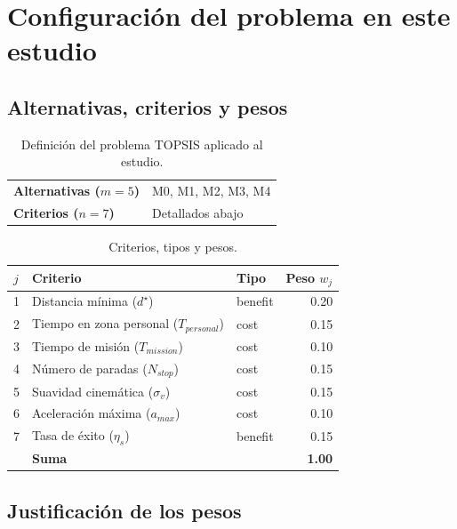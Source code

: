 \documentclass[12pt,a4paper,oneside]{book}
\begin{document}
\newpage
\section{Configuración del problema en este estudio}

\subsection{Alternativas, criterios y pesos}

\begin{table}[H]
\centering
\caption{Definición del problema TOPSIS aplicado al estudio.}
\renewcommand{\arraystretch}{1.3}
\begin{tabular}{ll}
\toprule
\textbf{Alternativas ($m=5$)} & M0, M1, M2, M3, M4 \\
\textbf{Criterios ($n=7$)} & Detallados abajo \\
\bottomrule
\end{tabular}
\end{table}

\begin{table}[H]
\centering
\caption{Criterios, tipos y pesos.}
\renewcommand{\arraystretch}{1.25}
\begin{tabular}{lllr}
\toprule
\textbf{$j$} & \textbf{Criterio} & \textbf{Tipo} & \textbf{Peso $w_j$} \\
\midrule
1 & Distancia mínima ($d^\star$) & benefit & 0.20 \\
2 & Tiempo en zona personal ($T_{personal}$) & cost & 0.15 \\
3 & Tiempo de misión ($T_{mission}$) & cost & 0.10 \\
4 & Número de paradas ($N_{stop}$) & cost & 0.15 \\
5 & Suavidad cinemática ($\sigma_v$) & cost & 0.15 \\
6 & Aceleración máxima ($a_{max}$) & cost & 0.10 \\
7 & Tasa de éxito ($\eta_s$) & benefit & 0.15 \\
\midrule
& \textbf{Suma} & & \textbf{1.00} \\
\bottomrule
\end{tabular}
\end{table}

\subsection{Justificación de los pesos}
\end{document}
